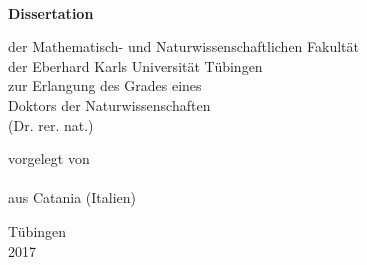 \begin{center}

\vspace{2cm}

\makeatletter
{\huge \bfseries \@title}\\

\vspace{5cm}

{\Large \bfseries Dissertation}\\

\vspace{0.5cm}

{\large der Mathematisch- und Naturwissenschaftlichen Fakult\"at\\
der Eberhard Karls Universit\"at T\"ubingen\\
zur Erlangung des Grades eines\\
Doktors der Naturwissenschaften\\
(Dr. rer. nat.)}\\

\vspace{5 cm}

{\large vorgelegt von \\
\@author\\
aus Catania (Italien)}\\

\vspace{3 cm}

{\large T\"ubingen\\
2017}\\

\vfill
\makeatother
\end{center}